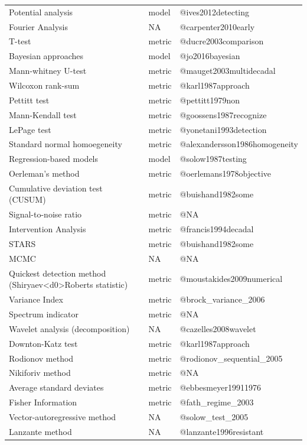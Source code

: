 \documentclass[12pt,twoside,openany]{reedthesis}
\begin{document}
\begin{longtable}{lll}
\addlinespace
Potential analysis & model & @ives2012detecting\\
Fourier Analysis & NA & @carpenter2010early\\
T-test & metric & @ducre2003comparison\\
Bayesian approaches & model & @jo2016bayesian\\
Mann-whitney U-test & metric & @mauget2003multidecadal\\
\addlinespace
Wilcoxon rank-sum & metric & @karl1987approach\\
Pettitt test & metric & @pettitt1979non\\
Mann-Kendall test & metric & @goossens1987recognize\\
LePage test & metric & @yonetani1993detection\\
Standard normal homoegeneity & metric & @alexandersson1986homogeneity\\
\addlinespace
Regression-based models & model & @solow1987testing\\
Oerleman's method & metric & @oerlemans1978objective\\
Cumulative deviation test (CUSUM) & metric & @buishand1982some\\
Signal-to-noise ratio & metric & @NA\\
Intervention Analysis & metric & @francis1994decadal\\
\addlinespace
STARS & metric & @buishand1982some\\
MCMC & NA & @NA\\
Quickest detection method (Shiryaev<d0>Roberts statistic) & metric & @moustakides2009numerical\\
Variance Index & metric & @brock\_variance\_2006\\
Spectrum indicator & metric & @NA\\
\addlinespace
Wavelet analysis (decomposition) & NA & @cazelles2008wavelet\\
Downton-Katz test & metric & @karl1987approach\\
Rodionov method & metric & @rodionov\_sequential\_2005\\
Nikiforiv method & metric & @NA\\
Average standard deviates & metric & @ebbesmeyer19911976\\
\addlinespace
Fisher Information & metric & @fath\_regime\_2003\\
Vector-autoregressive method & NA & @solow\_test\_2005\\
Lanzante method & NA & @lanzante1996resistant\\

\end{longtable}
\end{document}
